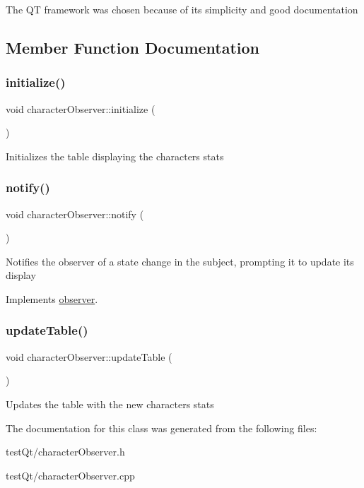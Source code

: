 The QT framework was chosen because of its simplicity and good documentation 

\subsection{Member Function Documentation}
\hypertarget{classcharacter_observer_a617083ec4e753ede947c6a355df18dfe}{}\label{classcharacter_observer_a617083ec4e753ede947c6a355df18dfe} 
\subsubsection{\texorpdfstring{initialize()}{initialize()}}
{\footnotesize\ttfamily void character\+Observer\+::initialize (\begin{DoxyParamCaption}{ }\end{DoxyParamCaption})}

Initializes the table displaying the character\textquotesingle{}s stats \hypertarget{classcharacter_observer_acef1a20aefd63499e3cbcad9fdfd7e02}{}\label{classcharacter_observer_acef1a20aefd63499e3cbcad9fdfd7e02} 
\subsubsection{\texorpdfstring{notify()}{notify()}}
{\footnotesize\ttfamily void character\+Observer\+::notify (\begin{DoxyParamCaption}{ }\end{DoxyParamCaption})\hspace{0.3cm}{\ttfamily [virtual]}}

Notifies the observer of a state change in the subject, prompting it to update its display 

Implements \hyperlink{classobserver}{observer}.

\hypertarget{classcharacter_observer_a1a3ec8b3be1a73dc89e413dc817a6077}{}\label{classcharacter_observer_a1a3ec8b3be1a73dc89e413dc817a6077} 
\subsubsection{\texorpdfstring{update\+Table()}{updateTable()}}
{\footnotesize\ttfamily void character\+Observer\+::update\+Table (\begin{DoxyParamCaption}{ }\end{DoxyParamCaption})}

Updates the table with the new character\textquotesingle{}s stats 

The documentation for this class was generated from the following files\+:\begin{DoxyCompactItemize}
\item 
test\+Qt/character\+Observer.\+h\item 
test\+Qt/character\+Observer.\+cpp\end{DoxyCompactItemize}
